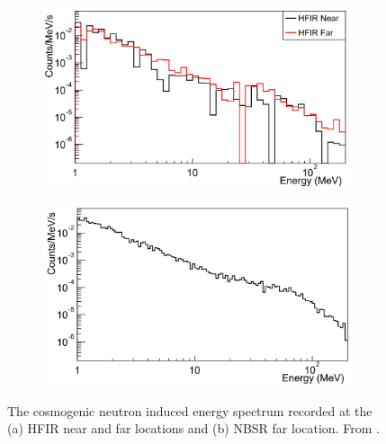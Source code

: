 \begin{figure}[htbp]
\centering
\begin{subfigure}{.5\textwidth}
  \centering
  \includegraphics[width=\linewidth]{Chapter2/Figs/Raster/Prospect_HFIR_nearFarPlot.png}
  \captionsetup{width=.9\linewidth}
  \caption{}
  \label{subFig:Prospect_HFIR_nearFarPlot}
\end{subfigure}%
\begin{subfigure}{.5\textwidth}
  \centering
\includegraphics[width=\linewidth]{Chapter2/Figs/Raster/Prospect_NBSR_farPlot.png}
  \captionsetup{width=.9\linewidth}
  \caption{}
  \label{subFig:Prospect_NBSR_farPlot}
\end{subfigure}
\caption{The cosmogenic neutron induced energy spectrum recorded at the (a) HFIR near and far locations and (b) NBSR far location. From \cite{Ashenfelter_2016}.}
\label{fig:Prospect_HFIR_NBSR_nearFarPlots}
\end{figure}

